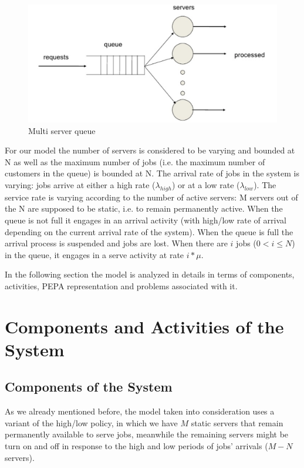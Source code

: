 \documentclass{article}
\begin{document}
\begin{figure}[H]
    \centering
    \includegraphics[width=1.0\textwidth]{multi-server-queue.png}
    \caption{Multi server queue}
    \label{fig:multi-server-queue}
\end{figure}

\par\noindent For our model the number of servers is considered to be varying and bounded at N as well as the maximum number of jobs (i.e. the maximum number of customers in the queue) is bounded at N. The arrival rate of jobs in the system is varying: jobs arrive at either a high rate (\(\lambda_{high}\)) or at a low rate (\(\lambda_{low}\)). The service rate is varying according to the number of active servers: M servers out of the N are supposed to be static, i.e. to remain permanently active.
When the queue is not full it engages in an arrival activity (with high/low rate of arrival depending on the current arrival rate of the system). When the queue is full the arrival process is suspended and jobs are lost. When there are \(i\) jobs (\(0 < i \leq N\)) in the queue, it engages in a serve activity at rate \(i*\mu\).\newline

\par\noindent In the following section the model is analyzed in details in terms of components, activities, PEPA representation and problems associated with it.

\section{Components and Activities of the System}

\subsection{Components of the System}
As we already mentioned before, the model taken into consideration uses a variant of the high/low policy, in which we have \(M\) static servers that remain permanently available to serve jobs, meanwhile the remaining servers might be turn on and off in response to the high and low periods of jobs' arrivals (\(M - N\) servers).\newline
\end{document}
